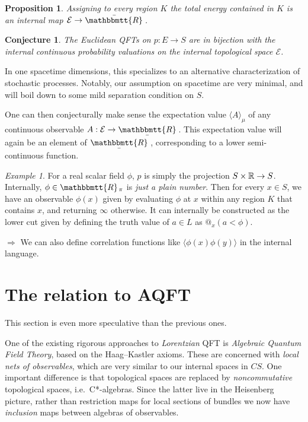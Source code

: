 \documentclass[11pt, oneside, article]{memoir}
\makeatletter
\theoremstyle{plain}
\newtheorem{proposition}[theorem]{Proposition}
\newtheorem{conjecture}[theorem]{Conjecture}
\theoremstyle{definition}
\theoremstyle{remark}
\newtheorem{example}[theorem]{Example}
\newcommand{\ubar}[1]{\underaccent{\bar}{#1}}
\newcommand{\internal}[1]{\raisebox{-.03ex}{$\mathbbmtt{#1}$}}
\newcommand{\hs}{\hspace{1.1pt}}
\newcommand{\tRR}{\internal{R}\hs}
\newcommand{\tLR}{\ubar{\tRR}\hs}
\newcommand{\tUR}{\bar{\tRR}\hs}
\newcommand{\AtSymbol}{{@}}
\newcommand{\At}[2][]{\AtSymbol^{#1}_{#2}}
\makeatother
\begin{document}
\begin{proposition}
Assigning to every region $K$ the \emph{total energy} contained in $K$ is an internal map $\mathcal{E} \to \tUR$.
\end{proposition}

\begin{conjecture}
The Euclidean QFTs on $p : E \to S$ are in bijection with the internal continuous probability valuations on the internal topological space $\mathcal{E}$.
\end{conjecture}

In one spacetime dimensions, this specializes to an alternative characterization of stochastic processes. Notably, our assumption on spacetime are very minimal, and will boil down to some mild separation condition on $S$.

One can then conjecturally make sense the expectation value $\langle A \rangle_\mu$ of any continuous observable $A : \mathcal{E} \to \tLR$. This expectation value will again be an element of $\tLR$, corresponding to a lower semi-continuous function.

\begin{example}
For a real scalar field $\phi$, $p$ is simply the projection $S \times \mathbb{R} \to S$. Internally, $\phi \in \tRR_\pi$ is \emph{just a plain number}. Then for every $x\in S$, we have an observable $\phi(x)$ given by evaluating $\phi$ at $x$ within any region $K$ that contains $x$, and returning $\infty$ otherwise. It can internally be constructed as the lower cut given by defining the truth value of $a\in L$ as $\At{x}(a < \phi)$.

$\Rightarrow$ We can also define correlation functions like $\langle \phi(x) \phi(y) \rangle$ in the internal language.
\end{example}

\chapter{The relation to AQFT}

This section is even more speculative than the previous ones.

One of the existing rigorous approaches to \emph{Lorentzian} QFT is \emph{Algebraic Quantum Field Theory}, based on the Haag--Kastler axioms. These are concerned with \emph{local nets of observables}, which are very similar to our internal spaces in $CS$. One important difference is that topological spaces are replaced by \emph{noncommutative} topological spaces, i.e.~C*-algebras. Since the latter live in the Heisenberg picture, rather than restriction maps for local sections of bundles we now have \emph{inclusion} maps between algebras of observables.
\end{document}

